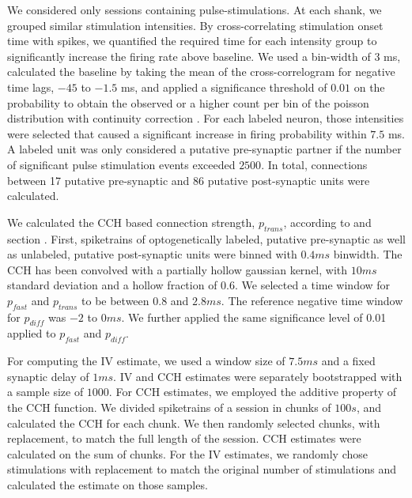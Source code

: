 \documentclass[11pt]{article}
\begin{document}
We considered only sessions containing pulse-stimulations.
At each shank, we grouped similar stimulation intensities.
By cross-correlating stimulation onset time with spikes, we quantified the required time for each intensity group to significantly increase the firing rate above baseline.
We used a bin-width of $3$ ms, calculated the baseline by taking the mean of the cross-correlogram for negative time lags, $-45$ to $-1.5$ ms, and applied a significance threshold of $0.01$ on the probability to obtain the observed or a higher count per bin of the poisson distribution with continuity correction \citep{abeles1982quantification}.
For each labeled neuron, those intensities were selected that caused a significant increase in firing probability within $7.5$ ms.
A labeled unit was only considered a putative pre-synaptic partner if the number of significant pulse stimulation events exceeded $2500$.
In total, connections between 17 putative pre-synaptic and 86 putative post-synaptic units were calculated.

We calculated the CCH based connection strength, $p_{trans}$, according to \citep{English2017} and section .
First, spiketrains of optogenetically labeled, putative pre-synaptic as well as unlabeled, putative post-synaptic units were binned with $0.4 ms$ binwidth.
The CCH has been convolved with a partially hollow gaussian kernel, with $10 ms$ standard deviation and a hollow fraction of $0.6$.
We selected a time window for $p_{fast}$ and $p_{trans}$ to be between $0.8$ and $2.8 ms$.
The reference negative time window for $p_{diff}$ was $-2$ to $0 ms$.
We further applied the same significance level of 0.01 applied to $p_{fast}$ and $p_{diff}$.

For computing the IV estimate, we used a window size of $7.5 ms$ and a fixed synaptic delay of $1 ms$.
IV and CCH estimates were separately bootstrapped with a sample size of $1000$.
For CCH estimates, we employed the additive property of the CCH function.
We divided spiketrains of a session in chunks of $100 s$, and calculated the CCH for each chunk.
We then randomly selected chunks, with replacement, to match the full length of the session.
CCH estimates were calculated on the sum of chunks.
For the IV estimates, we randomly chose stimulations with replacement to match the original number of stimulations and calculated the estimate on those samples.

\FloatBarrier
\end{document}
